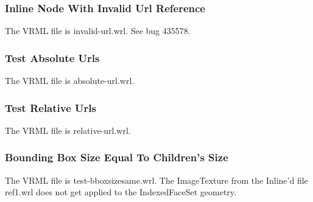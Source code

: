\documentclass[12pt,letterpaper]{article}
\newcommand{\SpGrC}{Inline Node With Invalid Url Reference}
\newcommand{\SpGrD}{Test Absolute Urls}
\newcommand{\SpGrE}{Test Relative Urls}
\newcommand{\SpGrF}{Bounding Box Size Equal To Children's Size}
\begin{document}
\subsubsection{\SpGrC}
The VRML file is invalid-url.wrl.
See bug 435578.

\subsubsection{\SpGrD}
The VRML file is absolute-url.wrl.

\subsubsection{\SpGrE}
The VRML file is relative-url.wrl.

\subsubsection{\SpGrF}
The VRML file is test-bboxsizesame.wrl.\newline
The ImageTexture from the Inline'd file ref1.wrl does not get
applied to the IndexedFaceSet geometry.
\end{document}
